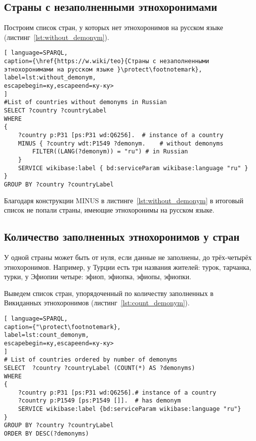 
\subsection{Страны с незаполненными этнохоронимами}

Построим список стран, у которых нет этнохоронимов на русском языке (листинг~\ref{lst:without_demonym}).
\begin{lstlisting}[ language=SPARQL, 
caption={\href{https://w.wiki/teo}{Страны с незаполненными этнохоронимами на русском языке }\protect\footnotemark},
label=lst:without_demonym, 
escapebegin=ку,escapeend=ку-ку>
]
#List of countries without demonyms in Russian
SELECT ?country ?countryLabel 
WHERE
{
	?country p:P31 [ps:P31 wd:Q6256].  # instance of a country
	MINUS { ?country wdt:P1549 ?demonym.    # without demonyms
		FILTER((LANG(?demonym)) = "ru") # in Russian
	}
	SERVICE wikibase:label { bd:serviceParam wikibase:language "ru" }
}
GROUP BY ?country ?countryLabel
\end{lstlisting}


Благодаря конструкции MINUS в листинге~\ref{lst:without_demonym}  в итоговый список не попали страны, имеющие этнохоронимы на русском языке. 

\subsection{Количество заполненных этнохоронимов у стран}

У одной страны может быть от нуля, если данные не заполнены, до трёх-четырёх этнохоронимов. Например, у Турции есть три названия жителей: турок, тарчанка, турки, у Эфиопии четыре: эфиоп, эфиопка, эфиопы, эфиопки.

Выведем список стран, упорядоченный по количеству заполненных в Викиданных этнохоронимов (листинг~\ref{lst:count_demonym}).

\begin{lstlisting}[ language=SPARQL, 
caption={"\protect\footnotemark},
label=lst:count_demonym, 
escapebegin=ку,escapeend=ку-ку>
]
# List of countries ordered by number of demonyms
SELECT  ?country ?countryLabel (COUNT(*) AS ?demonyms)
WHERE
{
	?country p:P31 [ps:P31 wd:Q6256].# instance of a country
	?country p:P1549 [ps:P1549 []].  # has demonym
	SERVICE wikibase:label {bd:serviceParam wikibase:language "ru"}
}
GROUP BY ?country ?countryLabel 
ORDER BY DESC(?demonyms)
\end{lstlisting}

